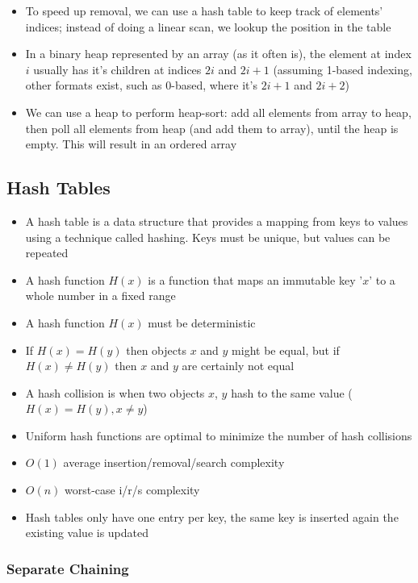 \documentclass{article}
\begin{document}
\begin{itemize}
\begin{itemize}
    \end{itemize}
    \item To speed up removal, we can use a hash table to keep track of elements' indices; instead of doing a linear scan, we lookup the position in the table
    \item In a binary heap represented by an array (as it often is), the element at index $i$ usually has it's children at indices $2i$ and $2i+1$ (assuming 1-based indexing, other formats exist, such as 0-based, where it's $2i+1$ and $2i+2$)
    \item We can use a heap to perform heap-sort: add all elements from array to heap, then poll all elements from heap (and add them to array), until the heap is empty. This will result in an ordered array
\end{itemize}

\subsection{Hash Tables}

\begin{itemize}
    \item A hash table is a data structure that provides a mapping from keys to values using a technique called hashing. Keys must be unique, but values can be repeated
    \item A hash function $H(x)$ is a function that maps an immutable key '$x$' to a whole number in a fixed range
    \item A hash function $H(x)$ must be deterministic
    \item If $H(x)=H(y)$ then objects $x$ and $y$ might be equal, but if $H(x) \ne H(y)$ then $x$ and $y$ are certainly not equal
    \item A hash collision is when two objects $x$, $y$ hash to the same value ($H(x)=H(y), x \ne y$)
    \item Uniform hash functions are optimal to minimize the number of hash collisions
    \item $O(1)$ average insertion/removal/search complexity
    \item $O(n)$ worst-case i/r/s complexity
    \item Hash tables only have one entry per key, the same key is inserted again the existing value is updated
\end{itemize}

\subsubsection{Separate Chaining}
\end{document}
